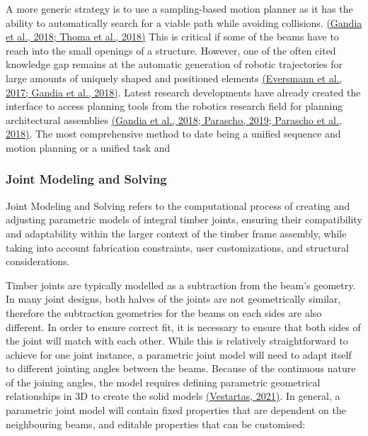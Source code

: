\documentclass[11pt]{book}
\begin{document}
A more generic strategy is to use a sampling-based motion planner as it has the ability to automatically search for a viable path while avoiding collisions. \href{https://www.zotero.org/google-docs/?wxRkWx}{(Gandia et al., 2018; Thoma et al., 2018)} This is critical if some of the beams have to reach into the small openings of a structure. However, one of the often cited knowledge gap remains at the automatic generation of robotic trajectories for large amounts of uniquely shaped and positioned elements \href{https://www.zotero.org/google-docs/?COr7LA}{(Eversmann et al., 2017; Gandia et al., 2018)}. Latest research developments have already created the interface to access planning tools from the robotics research field for planning architectural assemblies \href{https://www.zotero.org/google-docs/?LW23oL}{(Gandia et al., 2018; Parascho, 2019; Parascho et al., 2018)}. The most comprehensive method to date being a unified sequence and motion planning or a unified task and 

\subsubsection{Joint Modeling and Solving}

Joint Modeling and Solving refers to the computational process of creating and adjusting parametric models of integral timber joints, ensuring their compatibility and adaptability within the larger context of the timber frame assembly, while taking into account fabrication constraints, user customizations, and structural considerations.

Timber joints are typically modelled as a subtraction from the beam’s geometry. In many joint designs, both halves of the joints are not geometrically similar, therefore the subtraction geometries for the beams on each sides are also different. In order to ensure correct fit, it is necessary to ensure that both sides of the joint will match with each other. While this is relatively straightforward to achieve for one joint instance, a parametric joint model will need to adapt itself to different jointing angles between the beams. Because of the continuous nature of the joining angles, the model requires defining parametric geometrical relationships in 3D to create the solid models \href{https://www.zotero.org/google-docs/?Ix4BkB}{(Vestartas, 2021)}. In general, a parametric joint model will contain fixed properties that are dependent on the neighbouring beams, and editable properties that can be customised:
\end{document}
